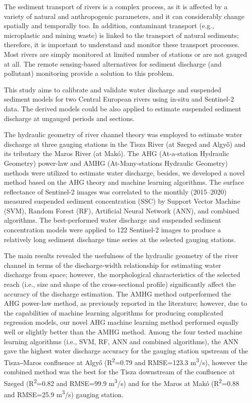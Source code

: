 {The sediment transport of rivers is a complex process, as it is affected by a variety of natural and anthropogenic parameters, and it can considerably change spatially and temporally too. In addition, contaminant transport (e.g., microplastic and mining waste) is linked to the transport of natural sediments; therefore, it is important to understand and monitor these transport processes. Most rivers are simply monitored at limited number of stations or are not gauged at all. The remote sensing-based alternatives for sediment discharge (and pollutant) monitoring provide a solution to this problem.

This study aims to calibrate and validate water discharge and suspended sediment models for two Central European rivers using in-situ and Sentinel-2 data. The derived models could be also applied to estimate suspended sediment discharge at ungauged periods and sections.

The hydraulic geometry of river channel theory was employed to estimate water discharge at three gauging stations in the Tisza River (at Szeged and Algyő) and its tributary the Maros River (at Makó). The AHG (At-a-station Hydraulic Geometry) power-law and AMHG (At-Many-stations Hydraulic Geometry) methods were utilized to estimate water discharge, besides, we developed a novel method based on the AHG theory and machine learning algorithms. The surface reflectance of Sentinel-2 images was correlated to the monthly (2015--2020) measured suspended sediment concentration (SSC) by Support Vector Machine (SVM), Random Forest (RF), Artificial Neural Network (ANN), and combined algorithms. The best-performed water discharge and suspended sediment concentration models were applied to 122 Sentinel-2 images to produce a relatively long sediment discharge time series at the selected gauging stations. 

The main results revealed the usefulness of the hydraulic geometry of the river channel in terms of the discharge-width relationship for estimating water discharge from space; however, the morphological characteristics of the selected reach (i.e., size and shape of the cross-sectional profile) significantly affect the accuracy of the discharge estimation. The AMHG method outperformed the AHG power-law method, as previously reported in the literature; however, due to the capabilities of machine learning algorithms for producing complicated regression models, our novel AHG machine learning method performed equally well or slightly better than the AMHG method. Among the four tested machine learning algorithms (i.e., SVM, RF, ANN and combined algorithms), the ANN gave the highest water discharge accuracy for the gauging station upstream of the Tisza‒Maros confluence at Algyő (R\textsuperscript{2}=0.79 and RMSE=123.3 m\textsuperscript{3}/s), however the combined method was the best for the Tisza downstream of the confluence at Szeged (R\textsuperscript{2}=0.82 and RMSE=99.9 m\textsuperscript{3}/s) and for the Maros at Makó (R\textsuperscript{2}=0.88 and RMSE=25.9 m\textsuperscript{3}/s) gauging station. 

}
